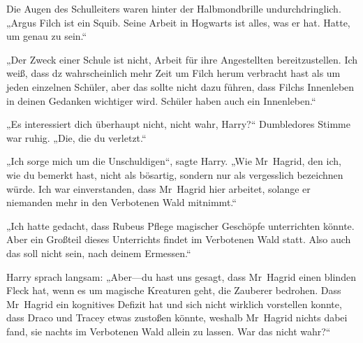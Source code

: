 Die Augen des Schulleiters waren hinter der Halbmondbrille undurchdringlich.
„Argus Filch ist ein Squib. Seine Arbeit in Hogwarts ist alles, was er hat. Hatte, um genau zu sein.“

„Der Zweck einer Schule ist nicht, Arbeit für ihre Angestellten bereitzustellen. Ich weiß, dass dz wahrscheinlich mehr Zeit um Filch herum verbracht hast als um jeden einzelnen Schüler, aber das sollte nicht dazu führen, dass Filchs Innenleben in deinen Gedanken wichtiger wird. Schüler haben auch ein Innenleben.“

„Es interessiert dich überhaupt nicht, nicht wahr, Harry?“ Dumbledores Stimme war ruhig. „Die, die du verletzt.“

„Ich sorge mich um die Unschuldigen“, sagte Harry. „Wie Mr~Hagrid, den ich, wie du bemerkt hast, nicht als bösartig, sondern nur als vergesslich bezeichnen würde. Ich war einverstanden, dass Mr~Hagrid hier arbeitet, solange er niemanden mehr in den Verbotenen Wald mitnimmt.“

„Ich hatte gedacht, dass Rubeus Pflege magischer Geschöpfe unterrichten könnte. Aber ein Großteil dieses Unterrichts findet im Verbotenen Wald statt. Also auch das soll nicht sein, nach deinem Ermessen.“

Harry sprach langsam: „Aber—du hast uns gesagt, dass Mr~Hagrid einen blinden Fleck hat, wenn es um magische Kreaturen geht, die Zauberer bedrohen. Dass Mr~Hagrid ein kognitives Defizit hat und sich nicht wirklich vorstellen konnte, dass Draco und Tracey etwas zustoßen könnte, weshalb Mr~Hagrid nichts dabei fand, sie nachts im Verbotenen Wald allein zu lassen. War das nicht wahr?“

